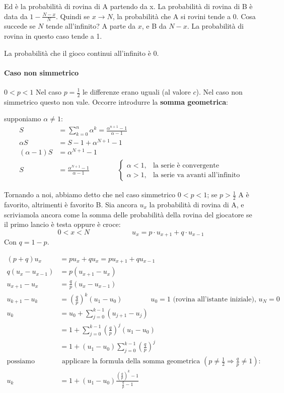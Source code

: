 \documentclass[a4paper,12pt]{book}
\newcommand\ddfrac[2]{\frac{\displaystyle #1}{\displaystyle #2}}
\begin{document}
Ed è la probabilità di rovina di A partendo da x. La probabilità di rovina di B è data da $ 1 - \frac{N-x}{N}$. Quindi se $ x \to N $, la probabilità che A si rovini tende a 0. Cosa succede se $ N $ tende all'infinito? A parte da $ x $, e B da $ N - x $. La probabilità di rovina in questo caso tende a 1. 

La probabilità che il gioco continui all'infinito è 0.

\paragraph{Caso non simmetrico} $ 0 < p < 1 $
Nel caso $ p = \ddfrac{1}{2} $ le differenze erano uguali (al valore $ c $). Nel caso non simmetrico questo non vale. Occorre introdurre la \textbf{somma geometrica}:

supponiamo $ \alpha \ne 1 $:
\begin{align*}
	S & = \sum_{k=0}^n \alpha^k = \ddfrac{\alpha^{n+1} - 1}{\alpha - 1} \\
	\alpha S & = S - 1 + \alpha^{N+1} - 1 \\
	(\alpha - 1)S & = \alpha^{N+1} - 1 \\
	S & = \ddfrac{\alpha^{N+1} - 1}{\alpha - 1} \qquad \qquad \begin{cases}
		\alpha < 1, & \text{la serie è convergente} \\
		\alpha > 1, & \text{la serie va avanti all'infinito}
	\end{cases}
\end{align*}

Tornando a noi, abbiamo detto che nel caso simmetrico $ 0 < p < 1 $; se $ p > \ddfrac{1}{2} $ A è favorito, altrimenti è favorito B. Sia ancora $ u_x $ la probabilità di rovina di A, e scriviamola ancora come la somma delle probabilità della rovina del giocatore se il primo lancio è testa oppure è croce:
$$ 0 < x < N \qquad \qquad \qquad u_x = p\cdot u_{x+1} + q\cdot u_{x-1} $$
Con $ q = 1-p $. 

\begin{align*}
	(p+q)u_x & = pu_x + qu_x = pu_{x+1} + qu_{x-1} \\
	q(u_x - u_{x-1})  & = p(u_{x+1} - u_x) \\
	u_{x+1} - u_x & = \frac{q}{p}(u_x - u_{x-1}) \\
	u_{k+1} - u_k & = (\frac{q}{p})^k(u_1 - u_0) \qquad \qquad u_0 = 1 \text{ (rovina all'istante iniziale), } u_N = 0 \\
	u_k & = u_0 + \sum_{j=0}^{k-1}(u_{j+1} - u_j) \\
	& = 1 + \sum_{j=0}^{k-1}(\frac{q}{p})^j(u_1 - u_0) \\
	& = 1 + (u_1 - u_0) \sum_{j=0}^{k-1} (\frac{q}{p})^j \\
	\text{possiamo} & \text{ applicare la formula della somma geometrica } (p\ne \frac{1}{2} \Rightarrow \frac{q}{p} \ne 1): \\	 
	 u_k & = 1 + (u_1 - u_0)\ddfrac{\left(\ddfrac{q}{p}\right)^k - 1}{\ddfrac{q}{p} - 1}
\end{align*}
\end{document}
